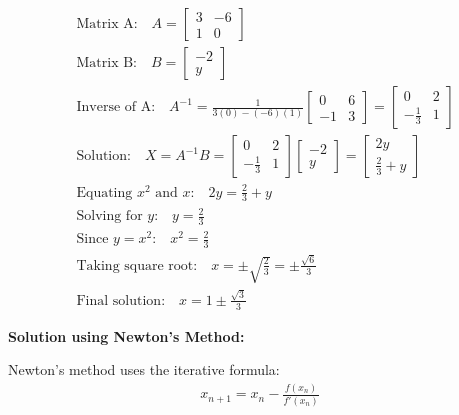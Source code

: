 \documentclass[journal]{IEEEtran}
\begin{document}
\begin{align}
    &\text{Matrix A:} \quad
    A = \begin{bmatrix}
    3 & -6 \\
    1 & 0
    \end{bmatrix} \\[2ex]
    &\text{Matrix B:} \quad
    B = \begin{bmatrix}
    -2 \\
    y
    \end{bmatrix} \\[2ex]
    &\text{Inverse of A:} \quad
    A^{-1} = \frac{1}{3(0) - (-6)(1)} \begin{bmatrix}
    0 & 6 \\
    -1 & 3
    \end{bmatrix} = \begin{bmatrix}
    0 & 2 \\
    -\frac{1}{3} & 1
    \end{bmatrix} \\[2ex]
    &\text{Solution:} \quad
    X = A^{-1}B = \begin{bmatrix}
    0 & 2 \\
    -\frac{1}{3} & 1
    \end{bmatrix}
    \begin{bmatrix}
    -2 \\
    y
    \end{bmatrix} =
    \begin{bmatrix}
    2y \\
    \frac{2}{3} + y
    \end{bmatrix} \\[2ex]
    &\text{Equating } x^2 \text{ and } x \text{:} \quad
    2y = \frac{2}{3} + y \\[2ex]
    &\text{Solving for } y \text{:} \quad
    y = \frac{2}{3} \\[2ex]
    &\text{Since } y = x^2 \text{:} \quad
    x^2 = \frac{2}{3} \\[2ex]
    &\text{Taking square root:} \quad
    x = \pm \sqrt{\frac{2}{3}} = \pm \frac{\sqrt{6}}{3} \\[2ex]
    &\text{Final solution:} \quad
    x = 1 \pm \frac{\sqrt{3}}{3}
\end{align}

\textbf{Solution using Newton's Method:}

Newton's method uses the iterative formula:
\begin{align}
    x_{n+1} = x_n - \frac{f(x_n)}{f'(x_n)}
\end{align}
\end{document}
